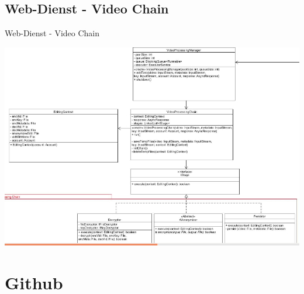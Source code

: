 \documentclass[19pt]{beamer}
\begin{document}
\subsection{Web-Dienst - Video Chain}
\begin{frame}{Web-Dienst - Video Chain}
\begin{center}
\includegraphics[scale=0.3]{resources/service_vidchain.png}
\end{center}
\end{frame}


\section{Github}
\end{document}

